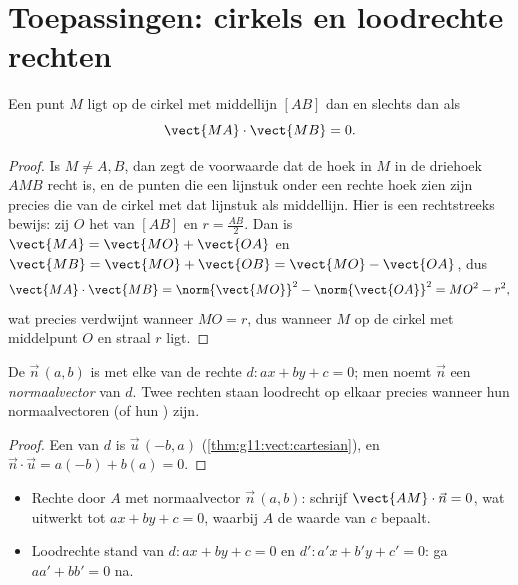 \section{Toepassingen: cirkels en loodrechte rechten}

\begin{proposition}\label{prop:g11:scal:diameter}
Een punt $M$ ligt op de cirkel met middellijn $[AB]$ dan en slechts dan als
\[
\vect{MA} \cdot \vect{MB} = 0 .
\]
\end{proposition}

\begin{proof}
Is $M \neq A, B$, dan zegt de voorwaarde dat de hoek in $M$ in de driehoek
$AMB$ recht is, en de punten die een lijnstuk onder een rechte hoek zien zijn
precies die van de cirkel met dat lijnstuk als middellijn. Hier is een
rechtstreeks bewijs: zij $O$ het  van $[AB]$ en $r = \frac{AB}{2}$.
Dan is $\vect{MA} = \vect{MO} + \vect{OA}$ en
$\vect{MB} = \vect{MO} + \vect{OB} = \vect{MO} - \vect{OA}$, dus
\[
\vect{MA}\cdot\vect{MB}
= \norm{\vect{MO}}^2 - \norm{\vect{OA}}^2 = MO^2 - r^2,
\]
wat precies verdwijnt wanneer $MO = r$, dus wanneer $M$ op de cirkel met
middelpunt $O$ en straal $r$ ligt.
\end{proof}

\begin{proposition}\label{prop:g11:scal:normal}
De  $\vec n\,(a, b)$ is  met elke  van de
rechte $d : ax + by + c = 0$; men noemt $\vec n$ een
\emph{normaalvector} van $d$. Twee rechten staan
loodrecht op elkaar precies wanneer hun normaalvectoren (of hun
)  zijn.
\end{proposition}

\begin{proof}
Een  van $d$ is $\vec u\,(-b, a)$
(\cref{thm:g11:vect:cartesian}), en $\vec n \cdot \vec u = a(-b) + b(a) = 0$.
\end{proof}

\begin{method}\label{met:g11:scal:normal}
\begin{itemize}
  \item Rechte door $A$ met normaalvector $\vec n\,(a,b)$: schrijf
        $\vect{AM} \cdot \vec n = 0$, wat uitwerkt tot $ax + by + c = 0$,
        waarbij $A$ de waarde van $c$ bepaalt.
  \item Loodrechte stand van $d: ax+by+c = 0$ en $d': a'x+b'y+c' = 0$: ga
        $aa' + bb' = 0$ na.
\end{itemize}
\end{method}

